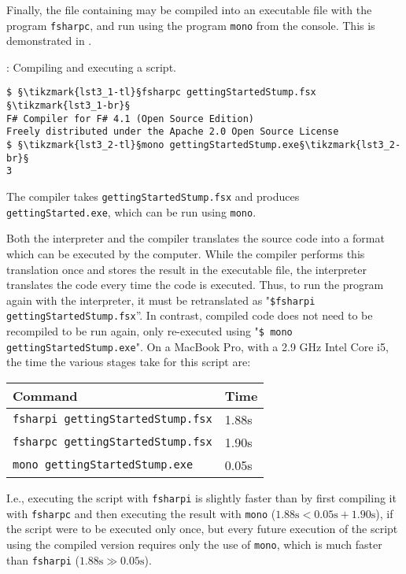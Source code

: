Finally, the file containing  may be compiled into an executable file with the program \lstinline[language=console]{fsharpc}, and run using the program \lstinline[language=console]{mono} from the console. This is demonstrated in .
%
\begin{codeNOutput}[label=compiler]{: Compiling and executing a script.}
\begin{lstlisting}[language=console,escapechar=§]
$ §\tikzmark{lst3_1-tl}§fsharpc gettingStartedStump.fsx §\tikzmark{lst3_1-br}§
F# Compiler for F# 4.1 (Open Source Edition)
Freely distributed under the Apache 2.0 Open Source License
$ §\tikzmark{lst3_2-tl}§mono gettingStartedStump.exe§\tikzmark{lst3_2-br}§
3
\end{lstlisting}
\end{codeNOutput}
%
%
%
The compiler takes \lstinline[language=console]{gettingStartedStump.fsx} and produces \lstinline[language=console]{gettingStarted.exe}, which can be run using \lstinline[language=console]{mono}.

Both the interpreter and the compiler translates the source code into a format which can be executed by the computer. While the compiler performs this translation once and stores the result in the executable file, the interpreter translates the code every time the code is executed. Thus, to run the program again with the interpreter, it must be retranslated as "\lstinline[language=console]{$fsharpi gettingStartedStump.fsx}''. %
In contrast, compiled code does not need to be recompiled to be run again, only re-executed using "\lstinline[language=console]{$ mono gettingStartedStump.exe}". %
On a MacBook Pro, with a 2.9 GHz Intel Core i5, the time the various stages take for this script are:
\begin{center}
  \begin{tabular}{|l|l|}
    \hline
    \rowcolor{headerRowColor} Command & Time\\
    \hline
    \lstinline[language=console]|fsharpi gettingStartedStump.fsx| & 1.88s\\
    \lstinline[language=console]|fsharpc gettingStartedStump.fsx| & 1.90s\\
    \lstinline[language=console]|mono gettingStartedStump.exe| & 0.05s\\
    \hline
\end{tabular}
\end{center}
I.e., executing the script with \lstinline[language=console]|fsharpi| is slightly faster than by first compiling it with \lstinline[language=console]|fsharpc| and then executing the result with \lstinline[language=console]|mono| ($1.88\text{s} < 0.05\text{s}+1.90\text{s}$), if the script were to be executed only once, but every future execution of the script using the compiled version requires only the use of \lstinline[language=console]|mono|, which is much faster than \lstinline[language=console]|fsharpi| ($1.88\text{s}\gg 0.05\text{s}$).

